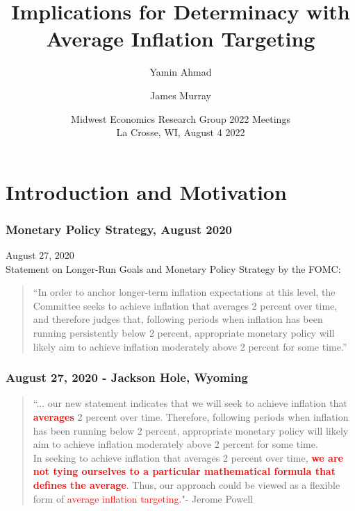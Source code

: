 \documentclass{beamer}
\begin{document}
\title[AIT-Indeterminacy]{Implications for Determinacy with Average Inflation Targeting}
\author[Ahmad]{Yamin Ahmad  \and James Murray }
\date{\color{red} Midwest Economics Research Group 2022 Meetings \color{black} \\ La Crosse, WI, August 4 2022}

\begin{frame}
	\vspace{-1.5cm}
	\titlepage
\end{frame}

\section*{Introduction and Motivation}

\begin{frame}
	\frametitle{Monetary Policy Strategy, August 2020}
	August 27, 2020 \\
	\vspace{1em} 
	Statement on Longer-Run Goals and Monetary Policy Strategy by the FOMC:
	\begin{quotation}
		``In order to anchor longer-term inflation expectations at this level, the Committee seeks to achieve inflation that averages 2 percent over time, and therefore judges that, following periods when inflation has been running persistently below 2 percent, appropriate monetary policy will likely aim to achieve inflation moderately above 2 percent for some time.''
	\end{quotation} 
\end{frame}

\begin{frame}
	\frametitle{August 27, 2020 - Jackson Hole, Wyoming}
	\begin{quotation}
		``... our new statement indicates that we will seek to achieve inflation that \textbf{\textcolor{red}{averages}} 2 percent over time. Therefore, following periods when inflation has been running below 2 percent, appropriate monetary policy will likely aim to achieve inflation moderately above 2 percent for some time. \\
		
		In seeking to achieve inflation that averages 2 percent over time, \textbf{\textcolor{red}{we are not tying ourselves to a particular mathematical formula that defines the average}}. Thus, our approach could be viewed as a flexible form of \textcolor{red}{average inflation targeting}."- Jerome Powell
	\end{quotation} 
\end{frame}
\end{document}
